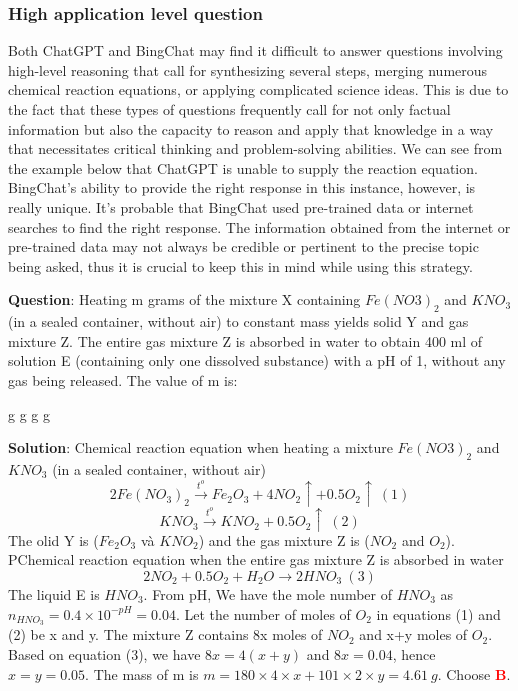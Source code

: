 \documentclass{article}
\begin{document}
{\begin{mdframed}[linewidth=1pt,linecolor=red]
		
		
	\end{mdframed}	
	
	\subsubsection{High application level question}
	\label{VNHSGE_Che_H}
	
	Both ChatGPT and BingChat may find it difficult to answer questions involving high-level reasoning that call for synthesizing several steps, merging numerous chemical reaction equations, or applying complicated science ideas. This is due to the fact that these types of questions frequently call for not only factual information but also the capacity to reason and apply that knowledge in a way that necessitates critical thinking and problem-solving abilities. We can see from the example below that ChatGPT is unable to supply the reaction equation. BingChat's ability to provide the right response in this instance, however, is really unique. It's probable that BingChat used pre-trained data or internet searches to find the right response. The information obtained from the internet or pre-trained data may not always be credible or pertinent to the precise topic being asked, thus it is crucial to keep this in mind while using this strategy.
	
	
	
	\begin{mdframed}[linewidth=1pt,linecolor=red] \textbf{Question}: Heating m grams of the mixture X containing $Fe(NO3)_2$ and $KNO_3$ (in a sealed container, without air) to constant mass yields solid Y and gas mixture Z. The entire gas mixture Z is absorbed in water to obtain 400 ml of solution E (containing only one dissolved substance) with a pH of 1, without any gas being released. The value of m is:
		
		\begin{oneparchoices}
			 g
			 g
			 g
			 g
		\end{oneparchoices}
		
		\textbf{Solution}: Chemical reaction equation when heating a mixture $Fe(NO3)_2$ and $KNO_3$ (in a sealed container, without air)  
		$$2Fe(NO_3)_2 \overset{t^o}{\longrightarrow} Fe_2O_3+4NO_2\uparrow +0.5O_2\uparrow~(1)$$ 
		$$KNO_3 \overset{t^o}{\longrightarrow} KNO_2 + 0.5O_2\uparrow~(2)$$ 
		The olid Y is ($Fe_2O_3$ và $KNO_2$) and the gas mixture Z is ($NO_2$ and $O_2$). 
		PChemical reaction equation when the entire gas mixture Z is absorbed in water
		$$2NO_2 +0.5O_2 + H_2O {\longrightarrow} 2 HNO_3~(3)$$
		The liquid E is $HNO_3$. From pH, We have the mole number of $HNO_3$ as $n_{HNO_3}=0.4\times10^{-pH}=0.04$. Let the number of moles of $O_2$ in equations (1) and (2) be x and y. The mixture Z contains 8x moles of $NO_2$ and x+y moles of $O_2$. Based on equation (3), we have $8x=4(x+y)$ and $8x=0.04$, hence $x=y=0.05$. The mass of m is $m=180 \times 4 \times x + 101 \times 2 \times y = 4.61~g$. Choose \textcolor{red}{\textbf{B}}. 
		

\end{mdframed}}
\end{document}
